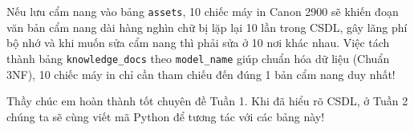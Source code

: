 \documentclass[11pt,a4paper]{article}
\begin{document}
\begin{notebox}
Nếu lưu cẩm nang vào bảng \texttt{assets}, 10 chiếc máy in Canon 2900 sẽ khiến đoạn văn bản cẩm nang dài hàng nghìn chữ bị lặp lại 10 lần trong CSDL, gây lãng phí bộ nhớ và khi muốn sửa cẩm nang thì phải sửa ở 10 nơi khác nhau. Việc tách thành bảng \texttt{knowledge\_docs} theo \texttt{model\_name} giúp chuẩn hóa dữ liệu (Chuẩn 3NF), 10 chiếc máy in chỉ cần tham chiếu đến đúng 1 bản cẩm nang duy nhất!
\end{notebox}

Thầy chúc em hoàn thành tốt chuyên đề Tuần 1. Khi đã hiểu rõ CSDL, ở Tuần 2 chúng ta sẽ cùng viết mã Python để tương tác với các bảng này!
\end{document}
